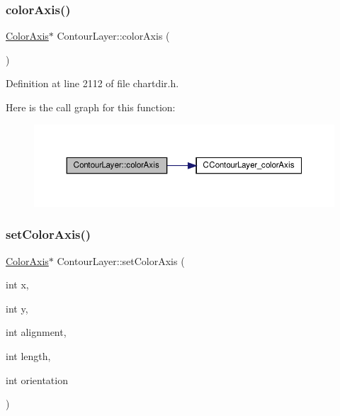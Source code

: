 \subsubsection{\texorpdfstring{color\+Axis()}{colorAxis()}}
{\footnotesize\ttfamily \hyperlink{class_color_axis}{Color\+Axis}$\ast$ Contour\+Layer\+::color\+Axis (\begin{DoxyParamCaption}{ }\end{DoxyParamCaption})\hspace{0.3cm}{\ttfamily [inline]}}



Definition at line 2112 of file chartdir.\+h.

Here is the call graph for this function\+:
\nopagebreak
\begin{figure}[H]
\begin{center}
\leavevmode
\includegraphics[width=350pt]{class_contour_layer_a0556505096c28150c6ba6768cfaee356_cgraph}
\end{center}
\end{figure}
\mbox{\label{class_contour_layer_a4ca46ccb1a8011f8e9ac33a42efcdf34}} 
\subsubsection{\texorpdfstring{set\+Color\+Axis()}{setColorAxis()}}
{\footnotesize\ttfamily \hyperlink{class_color_axis}{Color\+Axis}$\ast$ Contour\+Layer\+::set\+Color\+Axis (\begin{DoxyParamCaption}\item[{int}]{x,  }\item[{int}]{y,  }\item[{int}]{alignment,  }\item[{int}]{length,  }\item[{int}]{orientation }\end{DoxyParamCaption})\hspace{0.3cm}{\ttfamily [inline]}}



